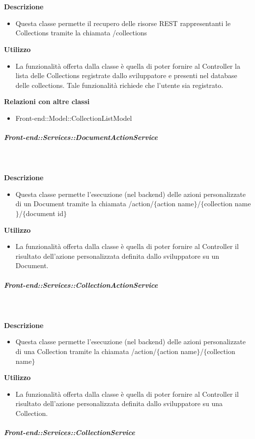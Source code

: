 \begin{itemize}
        \textbf{\\ \\ Descrizione} 
          \begin{itemize}
            \item[] Questa classe permette il recupero delle risorse REST rappresentanti le Collections tramite la chiamata /collections
          \end{itemize}      
        \textbf{Utilizzo}  
          \begin{itemize}
            \item[] La funzionalità offerta dalla classe è quella di poter fornire al Controller la lista delle Collections registrate dallo sviluppatore e presenti nel database delle collections.
Tale funzionalità richiede che l'utente sia registrato.
          \end{itemize}
          \textbf{Relazioni con altre classi}
          \begin{itemize}
              \item{Front-end::Model::CollectionListModel}
          \end{itemize}
      \subparagraph{Front-end::Services::DocumentActionService}
        
        \textbf{\\ \\ Descrizione} 
          \begin{itemize}
            \item[] Questa classe permette l'esecuzione (nel backend) delle azioni personalizzate di un Document tramite la chiamata /action/$\{$action name$\}$/$\{$collection name$\}$/$\{$document id$\}$
          \end{itemize}      
        \textbf{Utilizzo}  
          \begin{itemize}
            \item[] La funzionalità offerta dalla classe è quella di poter fornire al Controller il risultato dell'azione personalizzata definita dallo sviluppatore su un Document.
          \end{itemize}
      \subparagraph{Front-end::Services::CollectionActionService}
        
        \textbf{\\ \\ Descrizione} 
          \begin{itemize}
            \item[] Questa classe permette l'esecuzione (nel backend) delle azioni personalizzate di una Collection tramite la chiamata /action/$\{$action name$\}$/$\{$collection name$\}$
          \end{itemize}      
        \textbf{Utilizzo}  
          \begin{itemize}
            \item[] La funzionalità offerta dalla classe è quella di poter fornire al Controller il risultato dell'azione personalizzata definita dallo sviluppatore su una Collection.
          \end{itemize}
      \subparagraph{Front-end::Services::CollectionService}
        

\end{itemize}
